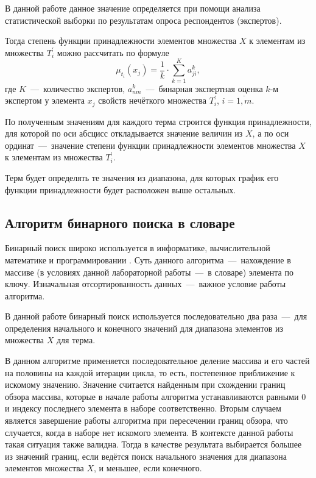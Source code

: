 В данной работе данное значение определяется при помощи анализа статистической выборки по результатам опроса респондентов (экспертов).

Тогда степень функции принадлежности элементов множества $X$ к элементам из множества $T_i^{'}$ можно рассчитать по формуле
\begin{equation}
	\mu_{t_i}(x_j) = \frac{1}{k} \cdot \sum\limits_{k=1}^K a^{k}_{ji},
\end{equation}
где $K$~---~количество экспертов, $a_{nm}^k$~---~бинарная экспертная оценка $k$-м экспертом у элемента $x_j$ свойств нечёткого множества $T_i^{'}$, $i = \overline{1,m}$.

По полученным значениям для каждого терма строится функция принадлежности, для которой по оси абсцисс откладывается значение величин из $X$, а по оси ординат~---~значение степени функции принадлежности элементов множества $X$ к элементам из множества $T_i^{'}$.

Терм будет определять те значения из диапазона, для которых график его функции принадлежности будет расположен выше остальных.

\subsection{Алгоритм бинарного поиска в словаре}
Бинарный поиск широко используется в информатике, вычислительной математике и программировании \cite{item9}. Суть данного алгоритма~---~нахождение в массиве (в условиях данной лабораторной работы~---~в словаре) элемента по ключу. Изначальная отсортированность данных~---~важное условие работы алгоритма. 

В данной работе бинарный поиск используется последовательно два раза~---~для определения начального и конечного значений  для диапазона элементов из множества $X$ для терма.

В данном алгоритме применяется последовательное деление массива и его частей на половины на каждой итерации цикла, то есть, постепенное приближение к искомому значению. Значение считается найденным при схождении границ обзора массива, которые в начале работы алгоритма устанавливаются равными 0 и индексу последнего элемента в наборе соответственно. Вторым случаем является завершение работы алгоритма при пересечении границ обзора, что случается, когда в наборе нет искомого элемента. В контексте данной работы такая ситуация также валидна. Тогда в качестве результата выбирается большее из значений границ, если ведётся поиск начального значения для диапазона элементов множества $X$, и меньшее, если конечного.

\newpage